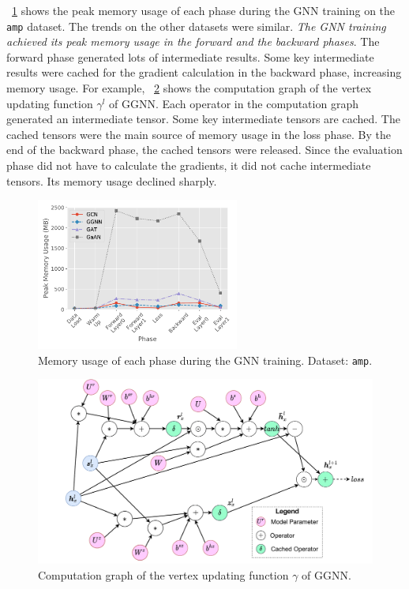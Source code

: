 \figurename~\ref{fig:exp_memory_usage_stage_amp} shows the peak memory usage of each phase during the GNN training on the \texttt{amp} dataset.
%
The trends on the other datasets were similar.
%
\emph{The GNN training achieved its peak memory usage in the forward and the backward phases}.
%
The forward phase generated lots of intermediate results.
%
Some key intermediate results were cached for the gradient calculation in the backward phase, increasing memory usage.
%
For example, \figurename~\ref{fig:ggnn_vertex_func_computation_graph} shows the computation graph of the vertex updating function $\gamma^l$ of GGNN.
%
Each operator in the computation graph generated an intermediate tensor.
%
Some key intermediate tensors are cached.
%
The cached tensors were the main source of memory usage in the loss phase.
%
By the end of the backward phase, the cached tensors were released.
%
Since the evaluation phase did not have to calculate the gradients, it did not cache intermediate tensors.
%
Its memory usage declined sharply.

\begin{figure}[H]
    \centering
    \includegraphics[height=5cm]{figs/experiments/exp_memory_usage_stage_amp.pdf}
    \caption{Memory usage of each phase during the GNN training. Dataset: \texttt{amp}.}
    \label{fig:exp_memory_usage_stage_amp}
\end{figure}

\begin{figure}[H]
    \centering
    \includegraphics[width=0.7\columnwidth]{figs/illustration/ggnn_vertex_func_computation_graph.pdf}
    \caption{Computation graph of the vertex updating function $\gamma$ of GGNN.}
    \label{fig:ggnn_vertex_func_computation_graph}
\end{figure}

